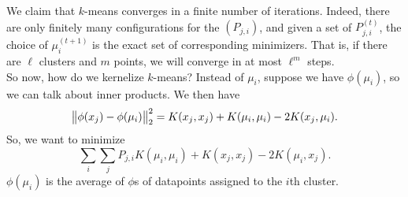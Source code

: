 \documentclass{article}
\begin{document}
			We claim that $k$-means converges in a finite number of iterations. Indeed, there are only finitely many configurations for the $(P_{j,i})$, and given a set of $P_{j,i}^{(t)}$, the choice of $\mu_i^{(t+1)}$ is the exact set of corresponding minimizers. That is, if there are $\ell$ clusters and $m$ points, we will converge in at most $\ell^m$ steps.\\

			So now, how do we kernelize $k$-means? Instead of $\mu_i$, suppose we have $\phi(\mu_i)$, so we can talk about inner products. We then have
			\[ \left\lVert\phi(x_j) - \phi(\mu_i)\right\rVert_2^2 = K(x_j,x_j) + K(\mu_i,\mu_i)  - 2K(x_j,\mu_i). \]
			So, we want to minimize
			\[ \sum_i \sum_j P_{j,i} K(\mu_i,\mu_i) + K(x_j,x_j) - 2K(\mu_i,x_j). \]
			$\phi(\mu_i)$ is the average of $\phi$s of datapoints assigned to the $i$th cluster.
\end{document}
